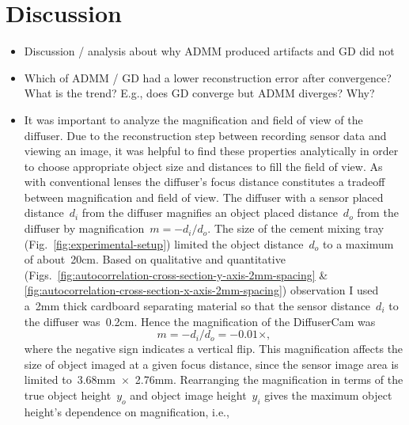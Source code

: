 \documentclass[final]{cvpr}
\begin{document}
\section{Discussion}

\begin{itemize}
	\item Discussion / analysis about why ADMM produced artifacts and GD
	      did not

	\item Which of ADMM / GD had a lower reconstruction error after
	      convergence?
	      What is the trend?
	      E.g., does GD converge but ADMM diverges?
	      Why?

	\item It was important to analyze the magnification and field of view of
	      the diffuser.
	      Due to the reconstruction step between recording sensor data and
	      viewing an image, it was helpful to find these properties
	      analytically in order to choose appropriate object size and
	      distances to fill the field of view.
	      As with conventional lenses the diffuser's focus distance
	      constitutes a tradeoff between magnification and field of view.
	      The diffuser with a sensor placed distance~$d_i$ from the diffuser
	      magnifies an object placed distance~$d_o$ from the diffuser by
	      magnification~$m = -d_i/d_o$.
	      The size of the cement mixing tray
	      (Fig.~\ref{fig:experimental-setup}) limited the object
	      distance~$d_o$ to a maximum of about~\num{20}cm.
	      Based on qualitative and quantitative
	      (Figs.~\ref{fig:autocorrelation-cross-section-y-axis-2mm-spacing}
	      \& \ref{fig:autocorrelation-cross-section-x-axis-2mm-spacing})
	      observation I used a~\num{2}mm thick cardboard separating
	      material so that the sensor distance~$d_i$ to the diffuser
	      was~\num{0.2}cm.
	      Hence the magnification of the DiffuserCam
	      was
	      \begin{equation}
		      m = -d_i/d_o = -0.01\times,
	      \end{equation}
	      where the negative sign indicates a vertical flip.
	      This magnification affects the size of object imaged at a given
	      focus distance, since the sensor image area is limited
	      to~\num{3.68}mm~$\times$~\num{2.76}mm.
	      Rearranging the magnification in terms of the true object
	      height~$y_o$ and object image height~$y_i$ gives the maximum
	      object height's dependence on magnification, i.e.,
	      \begin{equation}

\end{equation}
\end{itemize}
\end{document}
